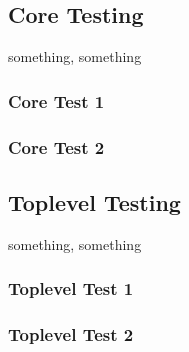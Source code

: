 \subsection{Core Testing}
something, something

\subsubsection{Core Test 1}

\subsubsection{Core Test 2}

\subsection{Toplevel Testing}
something, something

\subsubsection{Toplevel Test 1}

\subsubsection{Toplevel Test 2}

